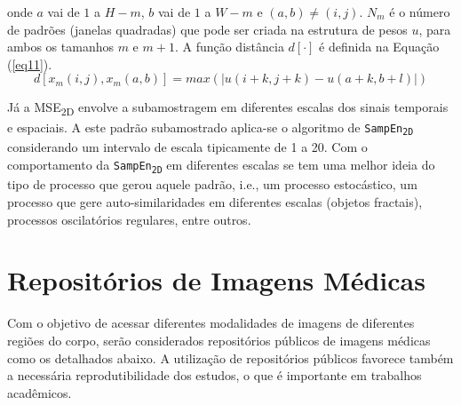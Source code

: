 \documentclass[
	12pt,				%
	openany,oneside,
	a4paper,			%
	english,			%
	brazil,				%
	]{abntex2}
\begin{document}
onde $a$ vai de $1$ a $H-m$, $b$ vai de $1$ a $W-m$ e $(a, b) \neq (i, j)$. $N_m$ é o número de padrões (janelas quadradas) que pode ser criada na estrutura de pesos $u$, para ambos os tamanhos $m$ e $m+1$. A função distância $d[\cdot]$ é definida na Equação (\ref{eq11}).
\begin{equation}
\label{eq11}
d[x_m(i,j), x_m(a,b)] = max(|u(i+k, j+k) - u(a+k, b+l)|)
\end{equation}

Já a MSE\textsubscript{2D} envolve a subamostragem em diferentes escalas dos sinais temporais e espaciais. A este padrão subamostrado aplica-se o algoritmo de \texttt{SampEn\textsubscript{2D}} considerando um intervalo de escala tipicamente de 1 a 20. Com o comportamento da \texttt{SampEn\textsubscript{2D}} em diferentes escalas se tem uma melhor ideia do tipo de processo que gerou aquele padrão, i.e., um processo estocástico, um processo que gere auto-similaridades em diferentes escalas (objetos fractais), processos oscilatórios regulares, entre outros.

\section{Repositórios de Imagens Médicas}
\label{sec:repositorios}
Com o objetivo de acessar diferentes modalidades de imagens de diferentes regiões do corpo, serão considerados repositórios públicos de imagens médicas como os detalhados abaixo. A utilização de repositórios públicos favorece também a necessária reprodutibilidade dos estudos, o que é importante em trabalhos acadêmicos.
\end{document}
